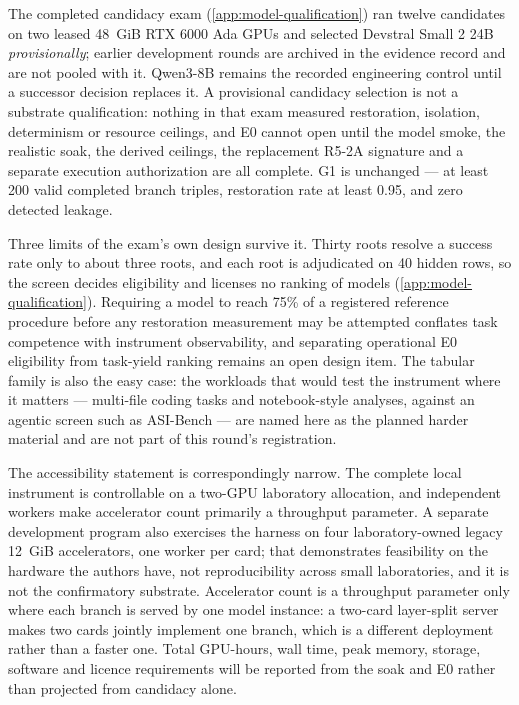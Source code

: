 The completed candidacy exam (\cref{app:model-qualification}) ran twelve
candidates on two leased 48~GiB RTX 6000 Ada GPUs and selected Devstral Small
2 24B \emph{provisionally}; earlier development rounds are archived in the evidence record and are not
pooled with it.  Qwen3-8B
remains the recorded engineering control until a successor decision replaces
it.  A provisional candidacy selection is not a substrate qualification:
nothing in that exam measured restoration, isolation, determinism or resource
ceilings, and E0 cannot open until the model smoke, the realistic soak, the
derived ceilings, the replacement R5-2A signature and a separate execution
authorization are all complete.  G1 is unchanged --- at least 200 valid
completed branch triples, restoration rate at least 0.95, and zero detected
leakage.

Three limits of the exam's own design survive it.  Thirty roots resolve a
success rate only to about three roots, and each root is adjudicated on 40
hidden rows, so the screen decides eligibility and licenses no ranking of
models (\cref{app:model-qualification}).  Requiring a model to reach
75\% of a registered reference procedure before any restoration measurement may be
attempted conflates task competence with instrument observability, and
separating operational E0 eligibility from task-yield ranking remains an open
design item.  The tabular family is also the easy case: the workloads that
would test the instrument where it matters --- multi-file coding tasks and
notebook-style analyses, against an agentic screen such as ASI-Bench --- are
named here as the planned harder material and are not part of this round's
registration.

The accessibility statement is correspondingly narrow.  The complete local
instrument is controllable on a two-GPU laboratory allocation, and independent
workers make accelerator count primarily a throughput parameter.  A separate
development program also exercises the harness on four laboratory-owned legacy
12~GiB accelerators, one worker per card; that demonstrates feasibility on the
hardware the authors have, not reproducibility across small laboratories, and it
is not the confirmatory substrate.  Accelerator count is a throughput parameter
only where each branch is served by one model instance: a two-card layer-split
server makes two cards jointly implement one branch, which is a different
deployment rather than a faster one.  Total GPU-hours, wall time, peak memory,
storage, software and licence requirements will be reported from the soak and
E0 rather than projected from candidacy alone.

